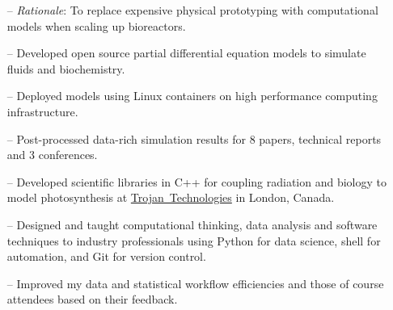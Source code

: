 \documentclass[10pt,a4paper]{altacv}
\begin{document}


\begin{fullwidth}
\makecvheader

\end{fullwidth}




\begin{itemize}
    \setlength{\itemindent}{0.3em}
    \item[--]  \small{\textit{Rationale}: To replace expensive physical 
    prototyping with computational models when scaling up bioreactors.}
    \item[--]   \small{Developed open source partial differential equation
    models to simulate fluids and biochemistry.} 
    \item[--] \small{Deployed models using Linux containers 
    on high performance computing infrastructure.}
    \item[--]  \small{Post-processed data-rich simulation results for 8 papers, 
    technical reports and 3 conferences.}
    \item[--]   \small{Developed scientific libraries in C++ for coupling 
    radiation and biology to model photosynthesis at 
    \href{https://www.trojantechnologies.com/}{Trojan~Technologies} 
    in London, Canada.}
\end{itemize}
\divider\smallskip

\begin{itemize}
    \setlength{\itemindent}{0.3em}
    \item[--]   \small{Designed and taught computational thinking, 
    data analysis and software techniques to industry professionals using
    Python for data science, shell for automation, and Git for version
    control.}
    \item[--]   \small{Improved my data and statistical workflow 
    efficiencies and those of course attendees based on their feedback.}
\end{itemize}
\divider\smallskip
\end{document}
